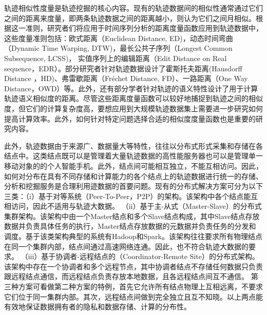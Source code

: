          轨迹相似性度量是轨迹挖掘的核心内容。现有的轨迹数据间的相似性通常通过它们之间的距离来度量，即两条轨迹数据之间的距离越小，则认为它们之间月相似。根据这一准则，研究者们将应用于时间序列分析的距离度量函数应用到轨迹数据中，这些度量准则包括：欧式距离（Euclidean Distance, ED)\cite{DTKST}，动态时间弯曲（Dynamic Time Warping, DTW)\cite{bandwidth}，最长公共子序列（Longest Common Subsequence, LCSS)\cite{crowdsourced,SmartTrace}，
         实值序列上的编辑距离（Edit Distance on Real sequence，EDR）\cite{EDR}。部分研究者针对轨迹数据设计了霍斯托夫距离(Hausdorff Distance ，HD)\cite{MaoSJZZ16}、弗雷歇距离（Fréchet Distance, FD）\cite{ZhuLYZHZ10,Guo2017}、一路距离（One Way Distance，OWD）\cite{LinS08}等。此外，还有部分学者针对轨迹的语义特性设计了用于计算轨迹语义相似度的距离\cite{Liu012,ZhaoX11,ZhengYZXSZ15}。尽管这些距离度量函数可以较好地捕捉到轨迹之间的相似度，但它们的计算复杂度高，要想应用到大规模轨迹数据集上需要进一步研究如何提高计算效率。此外，如何针对特定问题选择合适的相似度度量函数也是重要的研究内容\cite{Magdy2016Review,TooheyD15}。        
         
         此外，轨迹数据由于来源广、数据量大等特性，往往以分布式形式采集和存储在各结点中。这类结点既可以是管理着大量轨迹数据的高性能服务器也可以是管理单一移动对象的的个人智能手机。此外，结点间可能相互独立，不能互相访问。因此，
         如何对分布在具有不同存储和计算能力的各个结点上的轨迹数据进行统一的存储、分析和挖掘服务是合理利用迹数据的首要问题。现有的分布式解决方案可分为以下三类：（i）基于对等系统（Peer-To-Peer，P2P）的架构。该架构中各个结点能互相访问，因此不适用与轨迹大数据。
         （ii）基于主-从式（Master-Slave）的分布式集群架构。该架构中由一个Master结点和多个Slave结点构成，其中Slave结点存放数据并负责具体任务的执行，Master结点存放数据的元数据并负责任务的分发和调度。基于该类架构典型的系统有Hadoop和Spark。该架构往往要求所有物理结点在同一个集群内部，结点间通过高速网络连通。因此，也不符合轨迹大数据的要求。
         （iii）基于协调者-远程结点的（Coordinator-Remote Site）的分布式架构。该架构中存在一个协调者和多个远程节点，其中协调者结点不存储任何数据只负责跟远程结点通信，而远程结点负责存放本地数据，且各远程结点间互不通信。 第三种方案可看做第二种方案的特例，首先它允许所有结点物理上互相远离，不要求它们位于同一集群内部。其次，远程结点间做到完全独立且互不知晓。以上两点能有效地保证数据拥有者的隐私和数据存储、计算的分布性。
  
